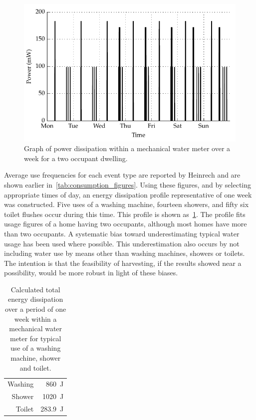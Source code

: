     \begin{figure}
        \centering
        \includegraphics[width=\linewidth]{content/pt1/02-WirelessWaterMeter/graphics/graph_profileEnergy}
        \caption{
          \label{fig:profile_powerDissipation}
          Graph of power dissipation within a mechanical water meter over a week for a two occupant dwelling.
        }
    \end{figure}
    Average use frequencies for each event type are reported by Heinrech and are shown earlier in~\cref{tab:consumption_figures}.
    Using these figures, and by selecting appropriate times of day, an energy dissipation profile representative of one week was constructed.
    Five uses of a washing machine, fourteen showers, and fifty six toilet flushes occur during this time.
    This profile is shown as~\cref{fig:profile_powerDissipation}.
    The profile fits usage figures of a home having two occupants, although most homes have more than two occupants.
    A systematic bias toward underestimating typical water usage has been used where possible.
    This underestimation also occurs by not including water use by means other than washing machines, showers or toilets.
    The intention is that the feasibility of harvesting, if the results showed near a possibility, would be more robust in light of these biases.
    \begin{table}
      \centering
      \begin{tabular}{r|r}
          Washing & \SI{860}{\joule}\\
          Shower  & \SI{1020}{\joule}\\
          Toilet  & \SI{283.9}{\joule}
      \end{tabular}
      \caption{
          \label{tab:energy_dissipation_total_figures}
          Calculated total energy dissipation over a period of one week within a mechanical water meter for typical use of a washing machine, shower and toilet.
      }
    \end{table}
